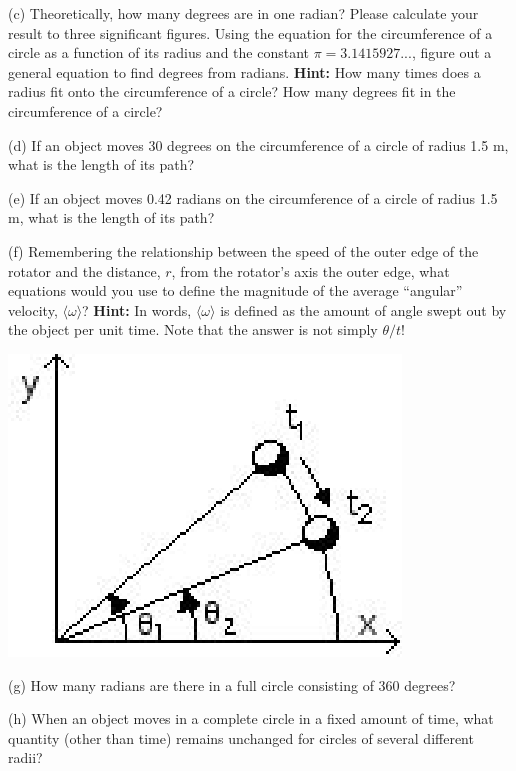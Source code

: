 (c) Theoretically, how many degrees are in one radian? Please calculate your
result to three significant figures. Using the equation for the circumference
of a circle as a function of its radius and the constant $\pi=3.1415927$..., 
figure
out a general equation to find degrees from radians. \textbf{Hint:} How many
times does a radius fit onto the circumference of a circle? How many degrees
fit in the circumference of a circle?
\answerspace{20mm}

(d) If an object moves 30 degrees on the circumference of a circle of radius
1.5 m, what is the length of its path?
\answerspace{20mm}

(e) If an object moves 0.42 radians on the circumference of a circle of radius
1.5 m, what is the length of its path?
\answerspace{20mm}

(f) Remembering the relationship between the speed of the outer edge of the
rotator and the distance, $r$, 
from the rotator's axis the outer edge, what equations
would you use to define the magnitude of the average ``angular''
velocity, \( \langle\omega \rangle \)? \textbf{Hint:} In words, 
\( \langle\omega \rangle \) is defined
as the amount of angle swept out by the object per unit time. Note that the
answer is not simply \( \theta/t  \)!

\vspace{0.3cm}
{\par\raggedright \includegraphics{rotation/rotation_fig8.eps} \par}
\vspace{0.3cm}

(g) How many radians are there in a full circle consisting of 360 degrees?
\vspace{10mm}

(h) When an object moves in a complete circle in a fixed amount of time, what
quantity (other than time) remains unchanged for circles of several different
radii? 
\vspace{10mm}

